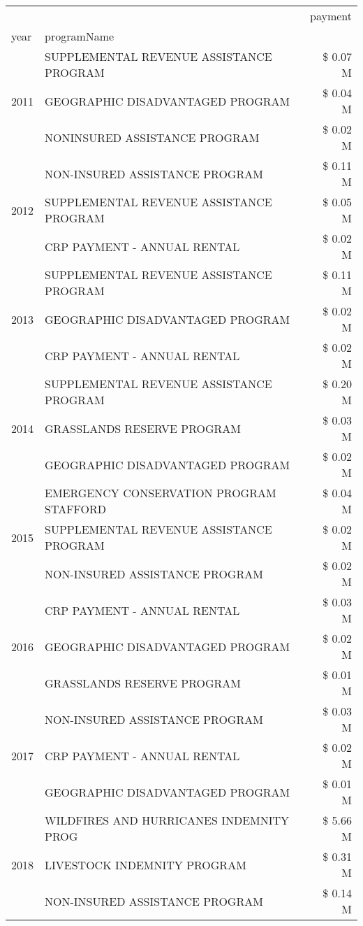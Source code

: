 \begin{tabular}{llr}
\toprule
 &  & payment \\
year & programName &  \\
\midrule
\multirow[t]{3}{*}{2011} & SUPPLEMENTAL REVENUE ASSISTANCE PROGRAM & \$ 0.07 M \\
 & GEOGRAPHIC DISADVANTAGED PROGRAM & \$ 0.04 M \\
 & NONINSURED ASSISTANCE PROGRAM & \$ 0.02 M \\
\cline{1-3}
\multirow[t]{3}{*}{2012} & NON-INSURED ASSISTANCE PROGRAM & \$ 0.11 M \\
 & SUPPLEMENTAL REVENUE ASSISTANCE PROGRAM & \$ 0.05 M \\
 & CRP PAYMENT - ANNUAL RENTAL & \$ 0.02 M \\
\cline{1-3}
\multirow[t]{3}{*}{2013} & SUPPLEMENTAL REVENUE ASSISTANCE PROGRAM & \$ 0.11 M \\
 & GEOGRAPHIC DISADVANTAGED PROGRAM & \$ 0.02 M \\
 & CRP PAYMENT - ANNUAL RENTAL & \$ 0.02 M \\
\cline{1-3}
\multirow[t]{3}{*}{2014} & SUPPLEMENTAL REVENUE ASSISTANCE PROGRAM & \$ 0.20 M \\
 & GRASSLANDS RESERVE PROGRAM & \$ 0.03 M \\
 & GEOGRAPHIC DISADVANTAGED PROGRAM & \$ 0.02 M \\
\cline{1-3}
\multirow[t]{3}{*}{2015} & EMERGENCY CONSERVATION PROGRAM STAFFORD & \$ 0.04 M \\
 & SUPPLEMENTAL REVENUE ASSISTANCE PROGRAM & \$ 0.02 M \\
 & NON-INSURED ASSISTANCE PROGRAM & \$ 0.02 M \\
\cline{1-3}
\multirow[t]{3}{*}{2016} & CRP PAYMENT - ANNUAL RENTAL & \$ 0.03 M \\
 & GEOGRAPHIC DISADVANTAGED PROGRAM & \$ 0.02 M \\
 & GRASSLANDS RESERVE PROGRAM & \$ 0.01 M \\
\cline{1-3}
\multirow[t]{3}{*}{2017} & NON-INSURED ASSISTANCE PROGRAM & \$ 0.03 M \\
 & CRP PAYMENT - ANNUAL RENTAL & \$ 0.02 M \\
 & GEOGRAPHIC DISADVANTAGED PROGRAM & \$ 0.01 M \\
\cline{1-3}
\multirow[t]{3}{*}{2018} & WILDFIRES AND HURRICANES INDEMNITY PROG & \$ 5.66 M \\
 & LIVESTOCK INDEMNITY PROGRAM & \$ 0.31 M \\
 & NON-INSURED ASSISTANCE PROGRAM & \$ 0.14 M \\

\end{tabular}
